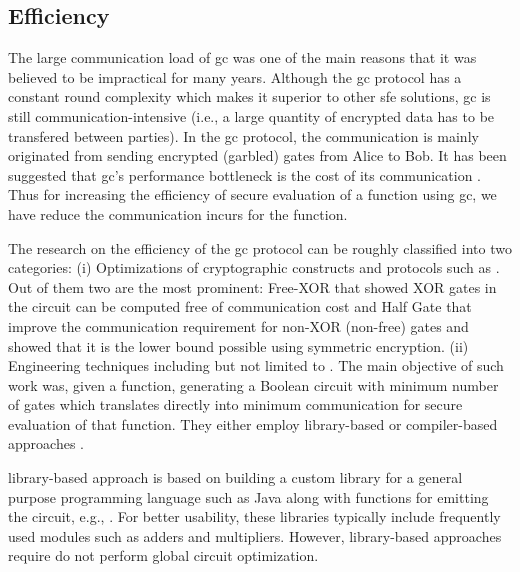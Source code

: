 \subsection{Efficiency}
The large communication load of gc was one of the main reasons that it was believed to be impractical for many years.
Although the \acrshort{gc} protocol has a constant round complexity which makes it superior to other \acrshort{sfe} solutions, \acrshort{gc} is still communication-intensive (i.e., a large quantity of encrypted data has to be transfered between parties).
In the gc protocol, the communication is mainly originated from sending encrypted (garbled) gates from Alice to Bob.
It has been suggested that gc's performance bottleneck is the cost of its communication \cite{gueron2015fast}.
Thus for increasing the efficiency of secure evaluation of a function using gc, we have reduce the communication incurs for the function.

The research on the efficiency of the \acrshort{gc} protocol can be roughly classified into two categories:
(i) Optimizations of cryptographic constructs and protocols such as \cite{kolesnikov2008improved,pinkas2009secure,bellare2012foundations,bellare2013efficient,kolesnikov2014flexor,zahur2015two}.
Out of them two are the most prominent: Free-XOR \cite{kolesnikov2008improved} that showed XOR gates in the circuit can be computed free of communication cost and Half Gate \cite{zahur2015two} that improve the communication requirement for non-XOR (non-free) gates and showed that it is the lower bound possible using symmetric encryption.
(ii) Engineering techniques including but not limited to \cite{henecka2010tasty,huang2011faster,henecka2013faster,kreuter2013pcf,franz2014cbmc,mood2016frigate}.
The main objective of such work was, given a function, generating a Boolean circuit with minimum number of gates which translates directly into minimum communication for secure evaluation of that function.
They either employ library-based \cite{huang2011faster,malka2011vmcrypt,henecka2013faster} or compiler-based approaches \cite{malkhi2004fairplay,kreuter2012billion,kreuter2013pcf,franz2014cbmc}.

library-based approach is based on building a custom library for a general purpose programming language such as Java along with functions for emitting the circuit, e.g., \cite{huang2011faster,malka2011vmcrypt,henecka2013faster}.
For better usability, these libraries typically include frequently used modules such as adders and multipliers.
However, library-based approaches require do not perform global circuit optimization.

